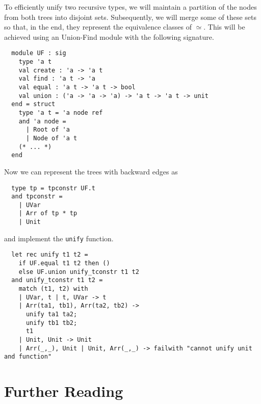 To efficiently unify two recursive types, we will maintain
a partition of the nodes from both trees into disjoint sets.
Subsequently, we will merge some of these sets so that,
in the end, they represent the equivalence classes of $\simeq$.
This will be achieved using an Union-Find module with the following signature.

\begin{verbatim}
  module UF : sig
    type 'a t
    val create : 'a -> 'a t
    val find : 'a t -> 'a
    val equal : 'a t -> 'a t -> bool
    val union : ('a -> 'a -> 'a) -> 'a t -> 'a t -> unit
  end = struct
    type 'a t = 'a node ref
    and 'a node =
      | Root of 'a
      | Node of 'a t
    (* ... *)
  end
\end{verbatim}

Now we can represent the trees with backward edges as

\begin{verbatim}
  type tp = tpconstr UF.t
  and tpconstr =
    | UVar
    | Arr of tp * tp
    | Unit
\end{verbatim}

and implement the \texttt{unify} function.

\begin{verbatim}
  let rec unify t1 t2 =
    if UF.equal t1 t2 then ()
    else UF.union unify_tconstr t1 t2
  and unify_tconstr t1 t2 =
    match (t1, t2) with
    | UVar, t | t, UVar -> t
    | Arr(ta1, tb1), Arr(ta2, tb2) ->
      unify ta1 ta2;
      unify tb1 tb2;
      t1
    | Unit, Unit -> Unit
    | Arr(_,_), Unit | Unit, Arr(_,_) -> failwith "cannot unify unit and function"
\end{verbatim}

\section{Further Reading}
